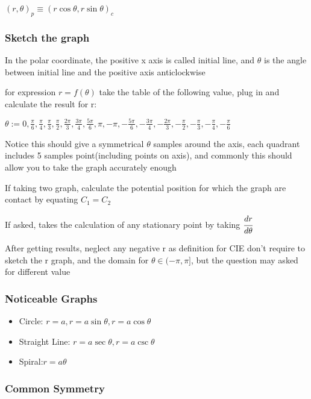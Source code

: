 \documentclass[]{article}
\begin{document}
\((r,\theta)_{p} \equiv (r\cos \theta, r\sin \theta)_{c}\)

\subsubsection{Sketch the graph}\label{header-n86}

In the polar coordinate, the positive x axis is called initial line, and
\(\theta\) is the angle between initial line and the positive axis
anticlockwise

for expression \(r = f(\theta)\) take the table of the following value,
plug in and calculate the result for r:

\(\theta :=  0,\frac{\pi}{6},\frac{\pi}{4},\frac{\pi}{3},\frac{\pi}{2},\frac{2\pi}{3},\frac{3\pi}{4},\frac{5\pi}{6},\pi,-\pi,-\frac{5\pi}{6},-\frac{3\pi}{4},-\frac{2\pi}{3},-\frac{\pi}{2},-\frac{\pi}{3},-\frac{\pi}{4},-\frac{\pi}{6}\)

Notice this should give a symmetrical \(\theta\) samples around the
axis, each quadrant includes 5 samples point(including points on axis),
and commonly this should allow you to take the graph accurately enough

If taking two graph, calculate the potential position for which the
graph are contact by equating \(C_{1} = C_{2}\)

If asked, takes the calculation of any stationary point by taking
\(\cfrac{dr}{d\theta}\)

After getting results, neglect any negative r as definition for CIE
don't require to sketch the r graph, and the domain for
\(\theta \in (-\pi,\pi]\), but the question may asked for different
value

\subsubsection{Noticeable Graphs}\label{header-n94}

\begin{itemize}
\item
  Circle: \(r = a, r = a\sin\theta, r = a\cos\theta\)
\item
  Straight Line: \(r = a\sec\theta, r = a\csc\theta\)
\item
  Spiral:\(r = a\theta\)
\end{itemize}

\subsubsection{Common Symmetry}\label{header-n102}
\end{document}
